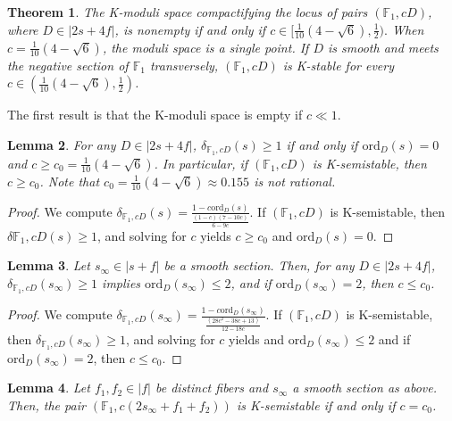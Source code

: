 \documentclass[11pt]{amsart}
\numberwithin{equation}{section}
\newtheorem{theorem}{Theorem}[section]
\newtheorem{lemma}[theorem]{Lemma}
\theoremstyle{definition}
\newcommand{\bF}{\mathbb{F}}
\newcommand{\ord}{\mathrm{ord}}
\begin{document}
\begin{theorem}\label{thm:kmodF1}
    The K-moduli space compactifying the locus of pairs $(\bF_1, c D)$, where $D \in |2s + 4f|$, is nonempty if and only if $c \in [ \frac{1}{10}(4 - \sqrt{6}), \frac{1}{2}).$  When $c = \frac{1}{10}(4 - \sqrt{6})$, the moduli space is a single point.  If $D$ is smooth and meets the negative section of $\bF_1$ transversely, $(\bF_1, cD)$ is K-stable for every $c \in ( \frac{1}{10}(4 - \sqrt{6}), \frac{1}{2})$.
\end{theorem}

The first result is that the K-moduli space is empty if $c \ll 1$. 

\begin{lemma}\label{lem:betaofsection}
    For any $D \in |2s + 4f|$, $\delta_{\bF_1, cD} (s) \ge 1$ if and only if $\ord_D(s) = 0$ and $c \ge c_0 = \frac{1}{10}(4 - \sqrt{6})$.  In particular, if $(\bF_1, cD)$ is K-semistable, then $c \ge c_0$.  Note that $c_0 = \frac{1}{10}(4 - \sqrt{6}) \approx 0.155$ is not rational.
\end{lemma}

\begin{proof}
    We compute $\delta_{\bF_1, cD} (s) = \frac{1 - c\ord_D(s)}{ \frac{(1-c)(7-10c)}{6-9c}} $.  If $(\bF_1, cD)$ is K-semistable, then $\delta{\bF_1, cD} (s) \ge 1$, and solving for $c$ yields $c \ge c_0$ and $\ord_D(s) = 0$.
\end{proof}

\begin{lemma}
    Let $s_{\infty} \in |s + f|$ be a smooth section.  Then, for any $D \in |2s+4f|$, $\delta_{\bF_1, cD}(s_\infty) \ge 1$ implies $\ord_D(s_\infty) \le 2$, and if $\ord_D(s_\infty) = 2$, then $c \le c_0$. 
\end{lemma}

\begin{proof}
    We compute $\delta_{\bF_1, cD} (s_\infty) = \frac{1 - c\ord_D(s_\infty)} {\frac{(28c^2-38c+13)}{12-18c}} $.  If $(\bF_1, cD)$ is K-semistable, then $\delta_{\bF_1, cD} (s_\infty) \ge 1$, and solving for $c$ yields and $\ord_D(s_\infty) \le 2$ and if $\ord_D(s_\infty) = 2$, then $c \le c_0$.
\end{proof}

\begin{lemma}
    Let $f_1, f_2 \in |f|$ be distinct fibers and $s_\infty$ a smooth section as above.  Then, the pair $(\bF_1, c(2s_\infty + f_1 + f_2))$ is K-semistable if and only if $c = c_0$.
\end{lemma}
\end{document}
